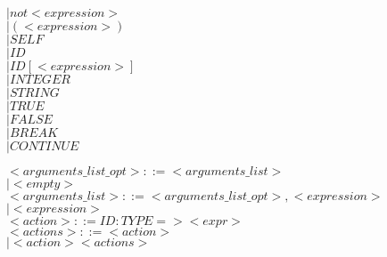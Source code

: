 \documentclass[11pt]{article}
\begin{document}
\begin{enumerate}
                          \hspace*{3.2cm}$|   not <expression>$\\
                          \hspace*{3.2cm}$|   ( <expression> )$\\
                          \hspace*{3.2cm}$|   SELF$\\
                          \hspace*{3.2cm}$|   ID$\\
                          \color{blue}
                          \hspace*{3.2cm}$|   ID[<expression>]$\\
                          \color{black}
                          \hspace*{3.2cm}$|   INTEGER$\\
                          \hspace*{3.2cm}$|   STRING$\\
                          \hspace*{3.2cm}$|   TRUE$\\
                          \hspace*{3.2cm}$|   FALSE$\\
                          \color{blue}
                          \hspace*{3.2cm}$|   BREAK$\\
                          \hspace*{3.2cm}$|   CONTINUE$\\
                          \color{black}

$<arguments\_list\_opt>      ::= <arguments\_list>$\\
                          \hspace*{4.5cm}$|   <empty>$\\

$<arguments\_list>          ::= <arguments\_list\_opt> , <expression>$\\
                          \hspace*{4.1cm}$|   <expression>$\\


$<action>                  ::= ID : TYPE => <expr>$\\

$<actions>                 ::= <action>$\\
                          \hspace*{2.7cm}$|   <action> <actions>$\\


\end{enumerate}
\end{document}
